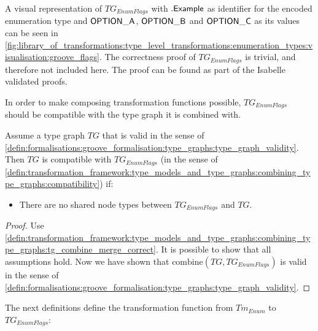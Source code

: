 A visual representation of $TG_{EnumFlags}$ with $.\mathsf{Example}$ as identifier for the encoded enumeration type and $\mathsf{OPTION\_A}$, $\mathsf{OPTION\_B}$ and $\mathsf{OPTION\_C}$ as its values can be seen in \cref{fig:library_of_transformations:type_level_transformations:enumeration_types:visualisation:groove_flags}. The correctness proof of $TG_{EnumFlags}$ is trivial, and therefore not included here. The proof can be found as part of the Isabelle validated proofs.

In order to make composing transformation functions possible, $TG_{EnumFlags}$ should be compatible with the type graph it is combined with.

\begin{thm}
\label{defin:library_of_transformations:type_level_transformations:enumeration_types:tg_enum_as_flags_combine_correct}
Assume a type graph $TG$ that is valid in the sense of \cref{defin:formalisations:groove_formalisation:type_graphs:type_graph_validity}. Then $TG$ is compatible with $TG_{EnumFlags}$ (in the sense of \cref{defin:transformation_framework:type_models_and_type_graphs:combining_type_graphs:compatibility}) if:
\begin{itemize}
    \item There are no shared node types between $TG_{EnumFlags}$ and $TG$.
\end{itemize}
\end{thm}

\begin{proof}
Use \cref{defin:transformation_framework:type_models_and_type_graphs:combining_type_graphs:tg_combine_merge_correct}. It is possible to show that all assumptions hold. Now we have shown that $\mathrm{combine}(TG, TG_{EnumFlags})$ is valid in the sense of \cref{defin:formalisations:groove_formalisation:type_graphs:type_graph_validity}.
\end{proof}

The next definitions define the transformation function from $Tm_{Enum}$ to $TG_{EnumFlags}$:

